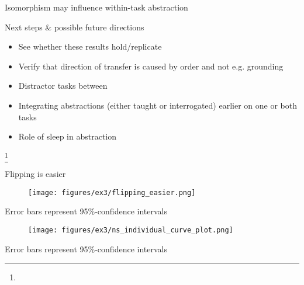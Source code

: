 \documentclass{beamer}
\newcommand\blfootnote[1]{%
  \begingroup
  \renewcommand\thefootnote{}\footnote{#1}%
  \addtocounter{footnote}{-1}%
  \endgroup
}
\begin{document}
\begin{frame}{Isomorphism may influence within-task abstraction}
\begin{figure}
\centering
{} 

\end{figure}
\end{frame}

\begin{frame}{Next steps \& possible future directions}
\begin{itemize}
\item See whether these results hold/replicate 
\item<2-> Verify that direction of transfer is caused by order and not e.g. grounding
\item<3-> Distractor tasks between
\item<4-> Integrating abstractions (either taught or interrogated) earlier on one or both tasks
\item<5-> Role of sleep in abstraction
\end{itemize}
\end{frame}

\begin{frame}[allowframebreaks]

\blfootnote{}
\end{frame}

\appendix

\begin{frame}{Flipping is easier}
\begin{figure}
\centering
\texttt{[image: figures/ex3/flipping\_easier.png]}
\end{figure}
{\scriptsize Error bars represent 95\%-confidence intervals}
\end{frame}

\begin{frame}
\begin{figure}
\centering
\texttt{[image: figures/ex3/ns\_individual\_curve\_plot.png]}
\end{figure}
{\scriptsize Error bars represent 95\%-confidence intervals}
\end{frame}
\end{document}
